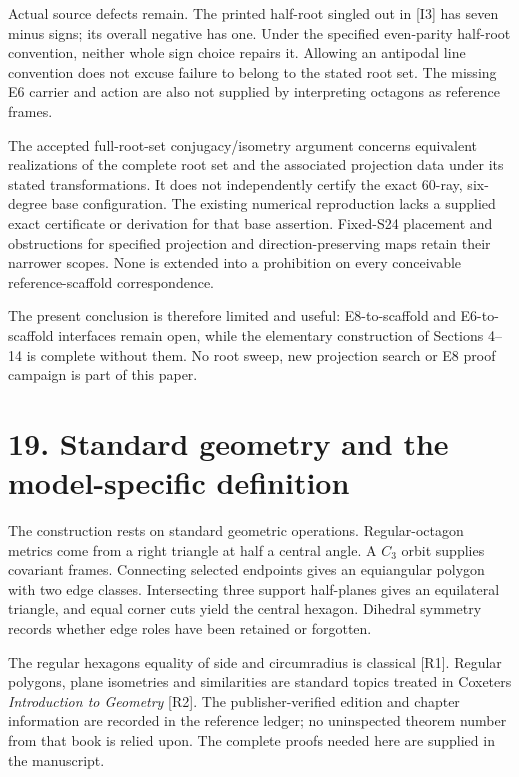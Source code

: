 \documentclass[
  11pt,
  a4paper,
]{article}
\begin{document}
Actual source defects remain. The printed half-root singled out in {[}I3{]} has seven minus signs; its overall negative has one. Under the specified even-parity half-root convention, neither whole sign choice repairs it. Allowing an antipodal line convention does not excuse failure to belong to the stated root set. The missing E6 carrier and action are also not supplied by interpreting octagons as reference frames.

The accepted full-root-set conjugacy/isometry argument concerns equivalent realizations of the complete root set and the associated projection data under its stated transformations. It does not independently certify the exact 60-ray, six-degree base configuration. The existing numerical reproduction lacks a supplied exact certificate or derivation for that base assertion. Fixed-S24 placement and obstructions for specified projection and direction-preserving maps retain their narrower scopes. None is extended into a prohibition on every conceivable reference-scaffold correspondence.

The present conclusion is therefore limited and useful: E8-to-scaffold and E6-to-scaffold interfaces remain open, while the elementary construction of Sections 4--14 is complete without them. No root sweep, new projection search or E8 proof campaign is part of this paper.

\section{19. Standard geometry and the model-specific definition}\label{standard-geometry-and-the-model-specific-definition}

The construction rests on standard geometric operations. Regular-octagon metrics come from a right triangle at half a central angle. A \(C_3\) orbit supplies covariant frames. Connecting selected endpoints gives an equiangular polygon with two edge classes. Intersecting three support half-planes gives an equilateral triangle, and equal corner cuts yield the central hexagon. Dihedral symmetry records whether edge roles have been retained or forgotten.

The regular hexagon\textquotesingle s equality of side and circumradius is classical {[}R1{]}. Regular polygons, plane isometries and similarities are standard topics treated in Coxeter\textquotesingle s \emph{Introduction to Geometry} {[}R2{]}. The publisher-verified edition and chapter information are recorded in the reference ledger; no uninspected theorem number from that book is relied upon. The complete proofs needed here are supplied in the manuscript.
\end{document}
